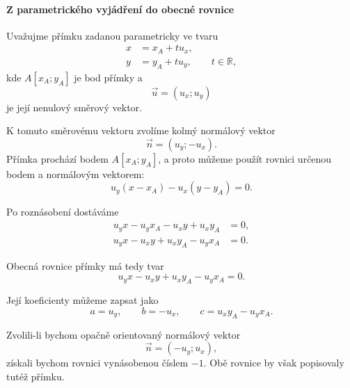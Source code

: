 \paragraph{Z parametrického vyjádření do obecné rovnice}

Uvažujme přímku zadanou parametricky ve tvaru
\begin{equation}\label{eq:Conversion_parametric_form}
    \begin{aligned}
        x&=x_A+t u_x,\\
        y&=y_A+t u_y,
        \qquad t\in\mathbb{R},
    \end{aligned}
\end{equation}
kde $A[x_A;y_A]$ je bod přímky a
\[
    \vec{u}=(u_x;u_y)
\]
je její nenulový směrový vektor.

K tomuto směrovému vektoru zvolíme kolmý normálový vektor
\[
    \vec{n}=(u_y;-u_x).
\]
Přímka prochází bodem $A[x_A;y_A]$, a proto můžeme použít rovnici
určenou bodem a normálovým vektorem:
\[
    u_y(x-x_A)-u_x(y-y_A)=0.
\]

Po roznásobení dostáváme
\begin{align*}
    u_yx-u_yx_A-u_xy+u_xy_A&=0,\\
    u_yx-u_xy+u_xy_A-u_yx_A&=0.
\end{align*}

Obecná rovnice přímky má tedy tvar
\begin{equation}\label{eq:Conversion_parametric_to_general}
    u_yx-u_xy+u_xy_A-u_yx_A=0.
\end{equation}

Její koeficienty můžeme zapsat jako
\[
    a=u_y,
    \qquad
    b=-u_x,
    \qquad
    c=u_xy_A-u_yx_A.
\]

Zvolili-li bychom opačně orientovaný normálový vektor
\[
    \vec{n}=(-u_y;u_x),
\]
získali bychom rovnici vynásobenou číslem $-1$. Obě rovnice by však
popisovaly tutéž přímku.

